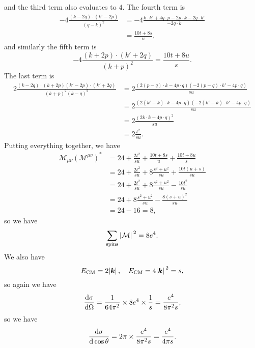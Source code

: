 \documentclass[hyperref, a4paper]{article}
\begin{document}
\begin{itemize}
\[\]
and the third term also evaluates to $4$. The fourth term is 
\[
    \begin{aligned}
        - 4 \frac{(k-2q) \cdot (k'-2p)}{(q-k)^2} &= -4 
        \frac{k \cdot k' + 4 q \cdot p - 2 p \cdot k - 2 q \cdot k'}{- 2 q \cdot k} \\
        &= \frac{10 t + 8 s}{u},
    \end{aligned}
\]
and similarly the fifth term is 
\[
    - 4 \frac{(k+2p) \cdot (k'+2q)}{(k+p)^2} = \frac{10 t + 8u}{s}.
\]
The last term is 
\[
    \begin{aligned}
        2 \frac{(k-2q) \cdot (k+2p) (k'-2p) \cdot (k'+2q)}{(k+p)^2 (k-q)^2} &= 
        2 \frac{(2 (p-q) \cdot k - 4 p \cdot q) (- 2 (p-q) \cdot k' - 4 p \cdot q)}{su} \\
        &= 2 \frac{(2 (k'-k) \cdot k - 4 p \cdot q) (- 2 (k'-k) \cdot k' - 4 p \cdot q)}{su} \\
        &= 2 \frac{(2 k \cdot k - 4 p \cdot q)^2}{su} \\
        &= 2 \frac{t^2}{su}.
    \end{aligned}
\]
Putting everything together, we have 
\[
    \begin{aligned}
        \mathcal{M}_{\mu \nu} (\mathcal{M}^{\mu \nu})^* &= 24 + \frac{2 t^2}{su} + \frac{10 t + 8 s}{u} + \frac{10 t + 8u}{s} \\
        &= 24 + \frac{2 t^2}{su} + 8 \frac{s^2 + u^2}{su} + \frac{10 t (u + s)}{su} \\
        &= 24 + \frac{2 t^2}{su} + 8 \frac{s^2 + u^2}{su} - \frac{10 t^2}{su} \\
        &= 24 + 8 \frac{s^2 + u^2}{su} - \frac{8 (s+u)^2}{su} \\
        &= 24 - 16 = 8,
    \end{aligned}
\]
so we have 
\begin{equation}
    \sum_\text{spins} \abs*{\mathcal{M}}^2 = 8 e^4.
\end{equation}
We also have 
\[
    E_\text{CM} = 2 \abs*{\vb*{k}}, \quad E_\text{CM} = 4 \abs*{\vb*{k}}^2 = s,
\]
so again we have 
\begin{equation}
    \dv{\sigma}{\Omega} = \frac{1}{64\pi^2} \times 8 e^4 \times \frac{1}{s} = \frac{e^4}{8 \pi^2 s},
\end{equation}
so we have 
\begin{equation}
    \dv{\sigma}{\cos \theta} = 2 \pi \times \frac{e^4}{8 \pi^2 s} = \frac{e^4}{4 \pi s}.
\end{equation}

\end{itemize}
\end{document}

